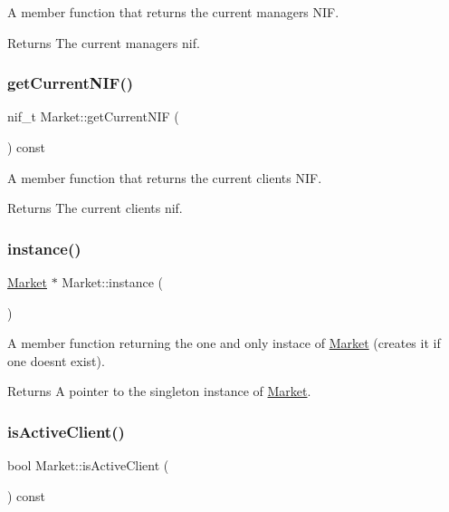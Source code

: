 A member function that returns the current manager\textquotesingle{}s N\+IF. \begin{DoxyReturn}{Returns}
The current manager\textquotesingle{}s nif. 
\end{DoxyReturn}
\hypertarget{class_market_acc909b8410ea76b1dfecf92088264741}{}\label{class_market_acc909b8410ea76b1dfecf92088264741} 
\subsubsection{\texorpdfstring{get\+Current\+N\+I\+F()}{getCurrentNIF()}}
{\footnotesize\ttfamily nif\+\_\+t Market\+::get\+Current\+N\+IF (\begin{DoxyParamCaption}{ }\end{DoxyParamCaption}) const}

A member function that returns the current client\textquotesingle{}s N\+IF. \begin{DoxyReturn}{Returns}
The current client\textquotesingle{}s nif. 
\end{DoxyReturn}
\hypertarget{class_market_ab55699aa5df4c8c7a6085cdd3ddc9b38}{}\label{class_market_ab55699aa5df4c8c7a6085cdd3ddc9b38} 
\subsubsection{\texorpdfstring{instance()}{instance()}}
{\footnotesize\ttfamily \hyperlink{class_market}{Market} $\ast$ Market\+::instance (\begin{DoxyParamCaption}{ }\end{DoxyParamCaption})\hspace{0.3cm}{\ttfamily [static]}}

A member function returning the one and only instace of \hyperlink{class_market}{Market} (creates it if one doesn\textquotesingle{}t exist). \begin{DoxyReturn}{Returns}
A pointer to the singleton instance of \hyperlink{class_market}{Market}. 
\end{DoxyReturn}
\hypertarget{class_market_a60df6a7d9ea6f4e2bd9eddc118fa81eb}{}\label{class_market_a60df6a7d9ea6f4e2bd9eddc118fa81eb} 
\subsubsection{\texorpdfstring{is\+Active\+Client()}{isActiveClient()}}
{\footnotesize\ttfamily bool Market\+::is\+Active\+Client (\begin{DoxyParamCaption}{ }\end{DoxyParamCaption}) const}


